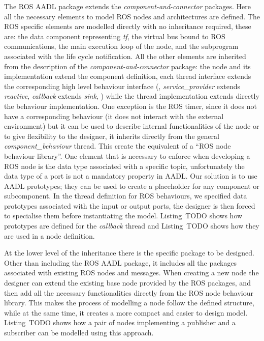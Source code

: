 The ROS AADL package extends the \textit{component-and-connector} packages. Here all the necessary elements to model ROS nodes and architectures are defined. The ROS specific elements are modelled directly with no inheritance required, these are: the data component representing \textit{tf}, the virtual bus bound to ROS communications, the main execution loop of the node, and the subprogram associated with the life cycle notification. All the other elements are inherited from the description of the \textit{component-and-connector} package: the node and its implementation extend the component definition, each thread interface extends the corresponding high level behaviour interface (\eg, \textit{service\_provider} extends \textit{reactive}, \textit{callback} extends \textit{sink}, \etc) while the thread implementation extends directly the behaviour implementation. One exception is the ROS timer, since it does not have a corresponding behaviour (it does not interact with the external environment) but it can be used to describe internal functionalities of the node or to give flexibility to the designer, it inherits directly from the general \textit{component\_behaviour} thread. This create the equivalent of a ``ROS node behaviour library''. One element that is necessary to enforce when developing a ROS node is the data type associated with a specific topic, unfortunately the data type of a port is not a mandatory property in AADL. Our solution is to use AADL prototypes; they can be used to create a placeholder for any component or subcomponent. In the thread definition for ROS behaviours, we specified data prototypes associated with the input or output ports, the designer is then forced to specialise them before instantiating the model. Listing~TODO shows how prototypes are defined for the \textit{callback} thread and Listing~TODO shows how they are used in a node definition.

At the lower level of the inheritance there is the specific package to be designed. Other than including the ROS AADL package, it includes all the packages associated with existing ROS nodes and messages. When creating a new node the designer can extend the existing base node provided by the ROS packages, and then add all the necessary functionalities directly from the ROS node behaviour library. This makes the process of modelling a node follow the defined structure, while at the same time, it creates a more compact and easier to design model. Listing~TODO shows how a pair of nodes implementing a publisher and a subscriber can be modelled using this approach.

